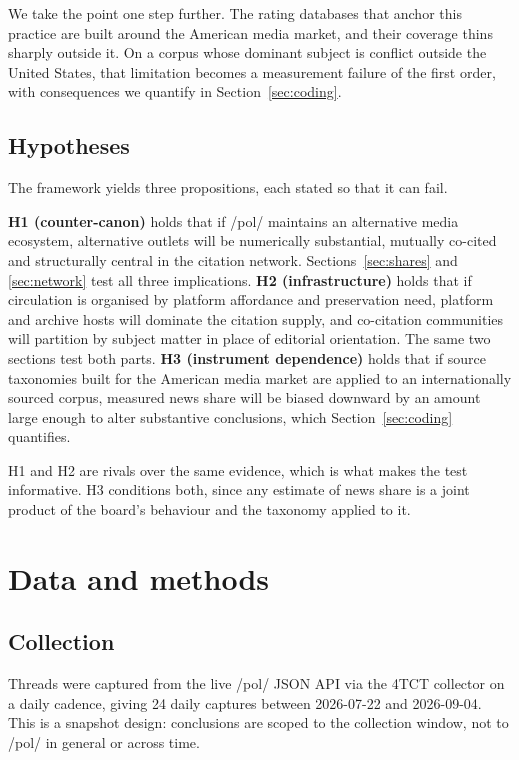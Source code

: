 \documentclass[11pt]{article}
\begin{document}
We take the point one step further. The rating databases that anchor this
practice are built around the American media market, and their coverage thins
sharply outside it. On a corpus whose dominant subject is conflict outside the
United States, that limitation becomes a measurement failure of the first order,
with consequences we quantify in Section~\ref{sec:coding}.

\subsection{Hypotheses}

The framework yields three propositions, each stated so that it can fail.

\textbf{H1 (counter-canon)} holds that if /pol/ maintains an alternative media
ecosystem, alternative outlets will be numerically substantial, mutually
co-cited and structurally central in the citation network.
Sections~\ref{sec:shares} and \ref{sec:network} test all three implications.
\textbf{H2 (infrastructure)} holds that if circulation is organised by platform
affordance and preservation need, platform and archive hosts will dominate the
citation supply, and co-citation communities will partition by subject matter in
place of editorial orientation. The same two sections test both parts.
\textbf{H3 (instrument dependence)} holds that if source taxonomies built for
the American media market are applied to an internationally sourced corpus,
measured news share will be biased downward by an amount large enough to alter
substantive conclusions, which Section~\ref{sec:coding} quantifies.

H1 and H2 are rivals over the same evidence, which is what makes the test
informative. H3 conditions both, since any estimate of news share is a joint
product of the board's behaviour and the taxonomy applied to it.

\section{Data and methods}

\subsection{Collection}

Threads were captured from the live /pol/ JSON API via the 4TCT collector on a
daily cadence, giving 24 daily captures between 2026-07-22 and 2026-09-04. This
is a snapshot design: conclusions are scoped to the collection window, not to
/pol/ in general or across time.
\end{document}

